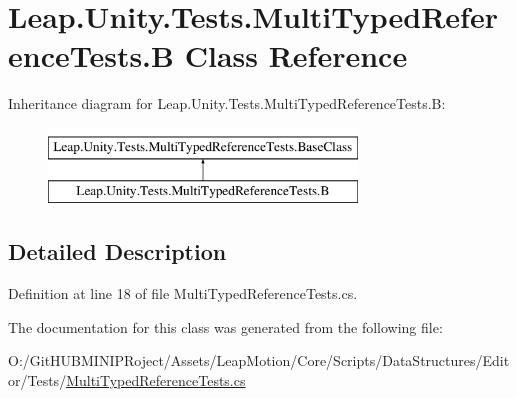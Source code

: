 \hypertarget{class_leap_1_1_unity_1_1_tests_1_1_multi_typed_reference_tests_1_1_b}{}\section{Leap.\+Unity.\+Tests.\+Multi\+Typed\+Reference\+Tests.\+B Class Reference}
\label{class_leap_1_1_unity_1_1_tests_1_1_multi_typed_reference_tests_1_1_b}
Inheritance diagram for Leap.\+Unity.\+Tests.\+Multi\+Typed\+Reference\+Tests.\+B\+:\begin{figure}[H]
\begin{center}
\leavevmode
\includegraphics[height=2.000000cm]{class_leap_1_1_unity_1_1_tests_1_1_multi_typed_reference_tests_1_1_b}
\end{center}
\end{figure}


\subsection{Detailed Description}


Definition at line 18 of file Multi\+Typed\+Reference\+Tests.\+cs.



The documentation for this class was generated from the following file\+:\begin{DoxyCompactItemize}
\item 
O\+:/\+Git\+H\+U\+B\+M\+I\+N\+I\+P\+Roject/\+Assets/\+Leap\+Motion/\+Core/\+Scripts/\+Data\+Structures/\+Editor/\+Tests/\mbox{\hyperlink{_multi_typed_reference_tests_8cs}{Multi\+Typed\+Reference\+Tests.\+cs}}\end{DoxyCompactItemize}
